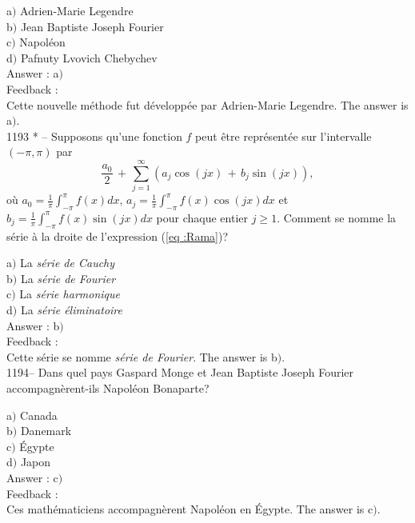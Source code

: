 \documentclass[letterpaper, 12pt]{article}
\begin{document}
a$)$ Adrien-Marie Legendre \\
b$)$ Jean Baptiste Joseph Fourier \\
c$)$ Napol\'eon \\
d$)$ Pafnuty Lvovich Chebychev\\

Answer : a$)$\\

Feedback : \\
Cette nouvelle m\'ethode fut d\'evelopp\'ee par Adrien-Marie
Legendre.
The answer is a$)$.\\

1193 * -- Supposons qu'une fonction $f$ peut \^etre repr\'esent\'ee
sur l'intervalle $(-\pi,\pi)$ par
\begin{equation}
\label{eq :Rama}
\displaystyle{\frac{a_0}2\,+\,\sum_{j=1}^{\infty}(a_j\cos(jx)\,+\,b_j\sin(jx)),}
\end{equation}
o\`u $\displaystyle{a_0=\frac1{\pi}\int_{-\pi}^{\pi}f(x)dx}$,
$\displaystyle{a_j=\frac1{\pi}\int_{-\pi}^{\pi}f(x)\cos(jx)dx}$ et
$\displaystyle{b_j=\frac1{\pi}\int_{-\pi}^{\pi}f(x)\sin(jx)dx}$ pour
chaque entier $j\ge1$. Comment se nomme la s\'erie \`a la droite de
l'expression (\ref{eq :Rama})?

a$)$ La {\sl s\'erie de Cauchy} \\
b$)$ La {\sl s\'erie de Fourier} \\
c$)$ La {\sl s\'erie harmonique} \\
d$)$ La {\sl s\'erie \'eliminatoire}\\

Answer : b$)$\\

Feedback : \\
Cette s\'erie se nomme {\sl s\'erie de Fourier}.
The answer is b$)$.\\

1194-- Dans quel pays Gaspard Monge et Jean Baptiste Joseph Fourier
accompagn\`erent-ils Napol\'eon Bonaparte?

a$)$ Canada \\
b$)$ Danemark \\
c$)$ \'Egypte \\
d$)$ Japon\\

Answer : c$)$\\

Feedback : \\
Ces math\'ematiciens accompagn\`erent Napol\'eon en \'Egypte.
The answer is c$)$.\\
\end{document}

